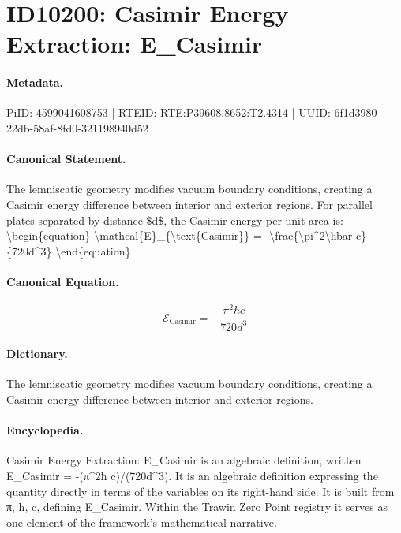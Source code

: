 \section*{ID10200: Casimir Energy Extraction: E\_Casimir}
\paragraph{Metadata.}
PiID: 4599041608753 | RTEID: RTE:P39608.8652:T2.4314 | UUID: 6f1d3980-22db-58af-8fd0-321198940d52

\paragraph{Canonical Statement.}
The lemniscatic geometry modifies vacuum boundary conditions, creating a Casimir energy difference between interior and exterior regions. For parallel plates separated by distance \$d\$, the Casimir energy per unit area is: \textbackslash{}begin\{equation\} \textbackslash{}mathcal\{E\}\_\{\textbackslash{}text\{Casimir\}\} = -\textbackslash{}frac\{\textbackslash{}pi\textasciicircum{}2\textbackslash{}hbar c\}\{720d\textasciicircum{}3\} \textbackslash{}end\{equation\}

\paragraph{Canonical Equation.}
\[
\mathcal{E}_{\text{Casimir}} = -\frac{\pi^2\hbar c}{720d^3}
\]

\paragraph{Dictionary.}
The lemniscatic geometry modifies vacuum boundary conditions, creating a Casimir energy difference between interior and exterior regions.

\paragraph{Encyclopedia.}
Casimir Energy Extraction: E\_Casimir is an algebraic definition, written E\_Casimir = -(π\textasciicircum{}2ħ c)/(720d\textasciicircum{}3). It is an algebraic definition expressing the quantity directly in terms of the variables on its right-hand side. It is built from π, ħ, c, defining E\_Casimir. Within the Trawin Zero Point registry it serves as one element of the framework's mathematical narrative.
